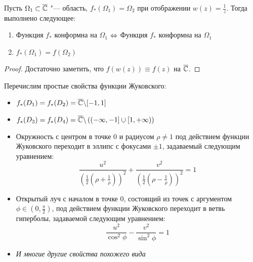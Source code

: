 \begin{proposition}
	Пусть $\Omega_1 \subset \overline{\mathbb{C}}$ "--- область, $f_*(\Omega_1) = \Omega_2$ при отображении $w(z) = \frac 1z$. Тогда выполнено следующее:
	\begin{enumerate}
		\item Функция $f_*$ конформна на $\Omega_1$ $\Leftrightarrow$ Функция $f_*$ конформна на $\Omega_1$
		\item $f_*(\Omega_1) = f(\Omega_2)$
	\end{enumerate}
\end{proposition}

\begin{proof}
	Достаточно заметить, что $f(w(z)) \equiv f(z)$ на $\overline{\mathbb{C}}$.
\end{proof}

\begin{note}
	Перечислим простые свойства функции Жуковского:
	\begin{itemize}
		\item $f_*(D_1) = f_*(D_2) = \overline{\mathbb{C}} \backslash [-1, 1]$
		\item $f_*(D_3) = f_*(D_4) = \overline{\mathbb{C}} \backslash \left((-\infty, -1] \cup [1, +\infty)\right)$
		\item Окружность с центром в точке $0$ и радиусом $\rho \ne 1$ под действием функции Жуковского переходит в эллипс с фокусами $\pm 1$, задаваемый следующим уравнением:
		\[\frac{u^2}{\left(\frac12\left(\rho + \frac 1\rho\right)\right)^2} + \frac{v^2}{\left(\frac12\left(\rho - \frac 1\rho\right)\right)^2} = 1\]
		\item Открытый луч с началом в точке $0$, состоящий из точек с аргументом $\phi \in \left(0, \frac\pi 2\right)$, под действием функции Жуковского переходит в ветвь гиперболы, задаваемой следующим уравнением:
		\[\frac{u^2}{\cos^2\phi} - \frac{v^2}{\sin^2\phi} = 1\]
		\item \textit{И многие другие свойства похожего вида}
	\end{itemize}
\end{note}
